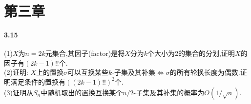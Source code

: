 \documentclass{article}
\begin{document}
\section{第三章}
\paragraph{3.15}(1)$X$为$n=2k$元集合,其因子(factor)是将$X$分为$k$个大小为2的集合的分划,证明$X$的因子有$(2k-1)!!$个.\\
(2)证明: $X$上的置换$\sigma$可以互换某些$k$-子集及其补集$\iff\sigma$的所有轮换长度为偶数.证明满足条件的置换有$((2k-1)!!)^2$个.\\%
(3)证明从$S_n$中随机取出的置换互换某个$n/2$-子集及其补集的概率为$O(1/\sqrt{n})$.%
\end{document}
